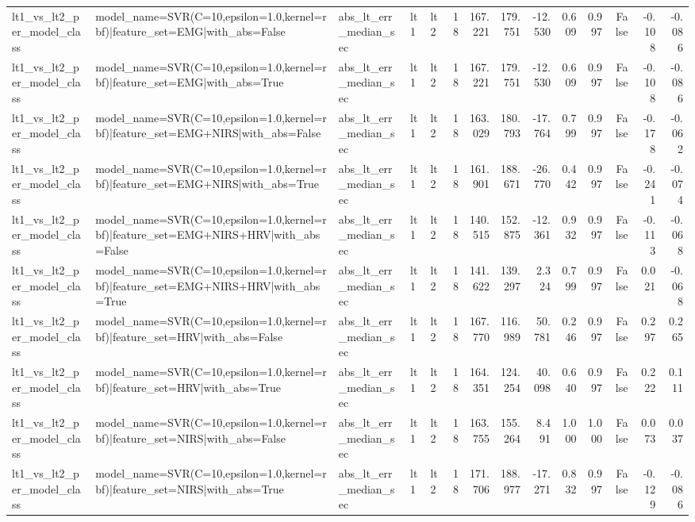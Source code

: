 \begin{table}
\begin{tabular}{lllllrrrrrrrrr}
lt1_vs_lt2_per_model_class & model_name=SVR(C=10,epsilon=1.0,kernel=rbf)|feature_set=EMG|with_abs=False & abs_lt_err_median_sec & lt1 & lt2 & 18 & 167.221 & 179.751 & -12.530 & 0.609 & 0.997 & False & -0.108 & -0.086 \\
lt1_vs_lt2_per_model_class & model_name=SVR(C=10,epsilon=1.0,kernel=rbf)|feature_set=EMG|with_abs=True & abs_lt_err_median_sec & lt1 & lt2 & 18 & 167.221 & 179.751 & -12.530 & 0.609 & 0.997 & False & -0.108 & -0.086 \\
lt1_vs_lt2_per_model_class & model_name=SVR(C=10,epsilon=1.0,kernel=rbf)|feature_set=EMG+NIRS|with_abs=False & abs_lt_err_median_sec & lt1 & lt2 & 18 & 163.029 & 180.793 & -17.764 & 0.799 & 0.997 & False & -0.178 & -0.062 \\
lt1_vs_lt2_per_model_class & model_name=SVR(C=10,epsilon=1.0,kernel=rbf)|feature_set=EMG+NIRS|with_abs=True & abs_lt_err_median_sec & lt1 & lt2 & 18 & 161.901 & 188.671 & -26.770 & 0.442 & 0.997 & False & -0.241 & -0.074 \\
lt1_vs_lt2_per_model_class & model_name=SVR(C=10,epsilon=1.0,kernel=rbf)|feature_set=EMG+NIRS+HRV|with_abs=False & abs_lt_err_median_sec & lt1 & lt2 & 18 & 140.515 & 152.875 & -12.361 & 0.932 & 0.997 & False & -0.113 & -0.068 \\
lt1_vs_lt2_per_model_class & model_name=SVR(C=10,epsilon=1.0,kernel=rbf)|feature_set=EMG+NIRS+HRV|with_abs=True & abs_lt_err_median_sec & lt1 & lt2 & 18 & 141.622 & 139.297 & 2.324 & 0.799 & 0.997 & False & 0.021 & -0.068 \\
lt1_vs_lt2_per_model_class & model_name=SVR(C=10,epsilon=1.0,kernel=rbf)|feature_set=HRV|with_abs=False & abs_lt_err_median_sec & lt1 & lt2 & 18 & 167.770 & 116.989 & 50.781 & 0.246 & 0.997 & False & 0.297 & 0.265 \\
lt1_vs_lt2_per_model_class & model_name=SVR(C=10,epsilon=1.0,kernel=rbf)|feature_set=HRV|with_abs=True & abs_lt_err_median_sec & lt1 & lt2 & 18 & 164.351 & 124.254 & 40.098 & 0.640 & 0.997 & False & 0.222 & 0.111 \\
lt1_vs_lt2_per_model_class & model_name=SVR(C=10,epsilon=1.0,kernel=rbf)|feature_set=NIRS|with_abs=False & abs_lt_err_median_sec & lt1 & lt2 & 18 & 163.755 & 155.264 & 8.491 & 1.000 & 1.000 & False & 0.073 & 0.037 \\
lt1_vs_lt2_per_model_class & model_name=SVR(C=10,epsilon=1.0,kernel=rbf)|feature_set=NIRS|with_abs=True & abs_lt_err_median_sec & lt1 & lt2 & 18 & 171.706 & 188.977 & -17.271 & 0.832 & 0.997 & False & -0.129 & -0.086 \\

\end{tabular}
\end{table}
